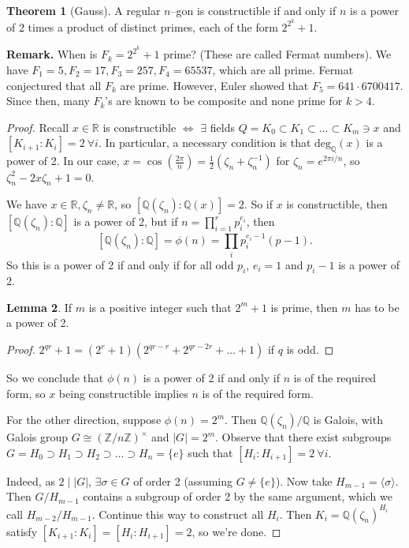 \documentclass{article}
\theoremstyle{definition}
\newtheorem{theorem}{Theorem}[section]
\newtheorem{lemma}[theorem]{Lemma}
\begin{document}
\begin{theorem}[Gauss]
    A regular $n$--gon is constructible if and only if $n$ is a power of 2 times a product of distinct primes, each of the form $2^{2^k}+1$.
\end{theorem}
\textbf{Remark.} When is $F_k=2^{2^k}+1$ prime? (These are called Fermat numbers). We have $F_1=5,F_2=17,F_3=257,F_4=65537$, which are all prime. Fermat conjectured that all $F_k$ are prime. However, Euler showed that $F_5 = 641 \cdot 6700417$. Since then, many $F_k$'s are known to be composite and none prime for $k>4$.


\begin{proof}
    Recall $x \in \mathbb{R}$ is constructible $\iff$ $\exists $ fields $Q=K_0 \subset K_1 \subset \ldots \subset K_m \ni x$ and $[K_{i+1}:K_i]=2 ~\forall i$. In particular, a necessary condition is that $\text{deg}_\mathbb{Q}(x)$ is a power of 2. In our case, $x=\cos(\frac{2\pi}{n}) = \frac{1}{2}(\zeta_n+\zeta_n^{-1})$ for $\zeta_n = e^{2\pi i/n}$, so $\zeta_n^2 - 2x \zeta_n + 1 =0.$

    We have $x \in \mathbb{R}, \zeta_n \neq \mathbb{R}$, so $[\mathbb{Q}(\zeta_n):\mathbb{Q}(x)]=2$. So if $x$ is constructible, then $[\mathbb{Q}(\zeta_n):\mathbb{Q}]$ is a power of 2, but if $n=\prod_{i=1}^{r} p_i^{e_i}$, then
    \[
    [\mathbb{Q}(\zeta_n):\mathbb{Q}] = \phi(n) = \prod_{i}^{} p_i^{e_i-1}(p-1).
    \]
    So this is a power of 2 if and only if for all odd $p_i$, $e_i=1$ and $p_i-1$ is a power of 2.
    \begin{lemma}
        If $m$ is a positive integer such that $2^m+1$ is prime, then $m$ has to be a power of 2.
    \end{lemma}
    \begin{proof}
        $2^{qr}+1 = (2^r+1)(2^{qr-r}+2^{qr-2r}+\ldots+1)$ if $q$ is odd.
    \end{proof}
    So we conclude that $\phi(n)$ is a power of 2 if and only if $n$ is of the required form, so $x$ being constructible implies $n$ is of the required form.
    \vspace{1mm}
    
    For the other direction, suppose $\phi(n)=2^m$. Then $\mathbb{Q}(\zeta_n)/\mathbb{Q}$ is Galois, with Galois group $G \cong (\mathbb{Z}/n\mathbb{Z})^\times$ and $|G|=2^m$. Observe that there exist subgroups $G = H_0 \supset H_1 \supset H_2 \supset \ldots \supset H_n = \{e\}$ such that $[H_i:H_{i+1}]=2 ~\forall i$.

    Indeed, as $2 \mid |G|$, $\exists \sigma \in G$ of order 2 (assuming $G \neq \{e\}$). Now take $H_{m-1} = \langle \sigma \rangle$. Then $G/H_{m-1}$ contains  a subgroup of order 2 by the same argument, which we call $H_{m-2}/H_{m-1}$. Continue this way to construct all $H_i$. Then $K_i = \mathbb{Q}(\zeta_n)^{H_i}$ satisfy $[K_{i+1}:K_i]= [H_i : H_{i+1}]=2$, so we're done.
\end{proof}
\end{document}
